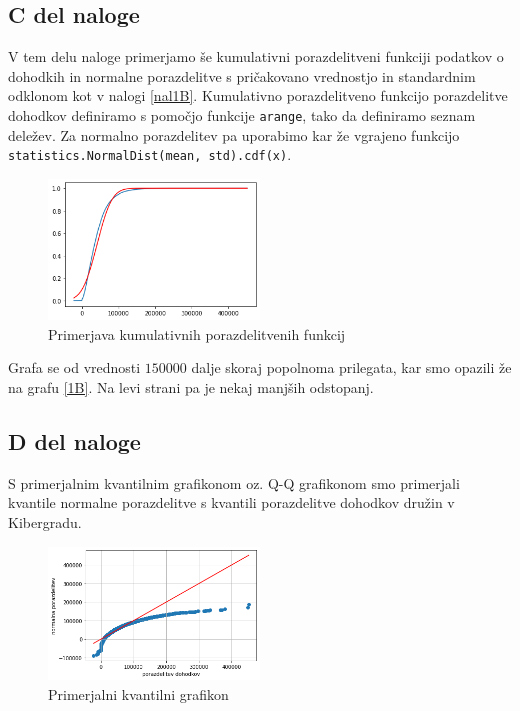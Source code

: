 \documentclass{article}
\begin{document}
\subsection{C del naloge}
V tem delu naloge primerjamo še kumulativni porazdelitveni funkciji podatkov o dohodkih in 
normalne porazdelitve s pričakovano vrednostjo in standardnim odklonom kot v nalogi \ref{nal1B}.
Kumulativno porazdelitveno funkcijo porazdelitve dohodkov definiramo s pomočjo
funkcije \texttt{arange}, tako da definiramo seznam deležev. Za normalno porazdelitev pa uporabimo kar že vgrajeno funkcijo
\texttt{statistics.NormalDist(mean, std).cdf(x)}.
\begin{figure}[H]
    \begin{center}
        \includegraphics*[width=0.5\textwidth]{figure1C.png}
        \caption{Primerjava kumulativnih porazdelitvenih funkcij}
        \label{kumulativne}
    \end{center}
\end{figure}

Grafa se od vrednosti $150000$ dalje skoraj popolnoma prilegata,
kar smo opazili že na grafu \ref{1B}. Na levi strani pa je nekaj manjših odstopanj.


\subsection{D del naloge}
S primerjalnim kvantilnim grafikonom oz. Q-Q grafikonom smo primerjali kvantile normalne porazdelitve s kvantili 
porazdelitve dohodkov družin v Kibergradu.
\begin{figure}[H]
    \begin{center}
        \includegraphics*[width=0.5\textwidth]{figure1D.png}
        \caption{Primerjalni kvantilni grafikon}
        \label{QQ}
    \end{center}
\end{figure}
\end{document}
